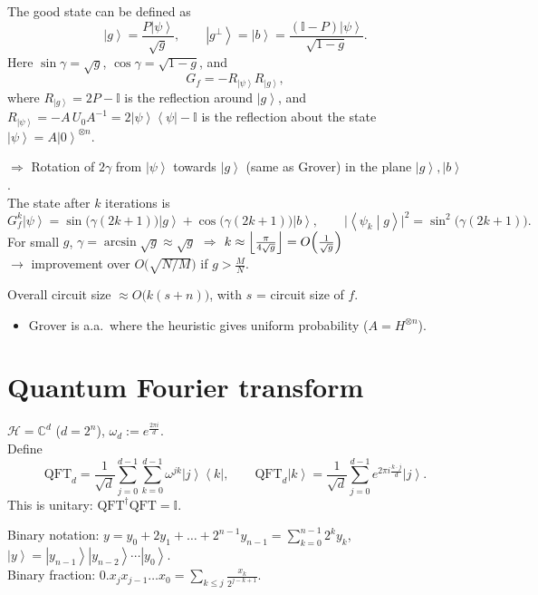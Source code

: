 \documentclass[11pt,a4paper]{article}
\renewcommand{\ket}[1]{\left|#1\right\rangle}
\renewcommand{\braket}[2]{\left\langle#1\middle|#2\right\rangle}
\newcommand{\ketbra}[2]{\left|#1\right\rangle\!\left\langle#2\right|}
\newcommand{\Hil}{\mathcal{H}}
\newcommand{\CC}{\mathbb{C}}
\newcommand{\id}{\mathbb{I}}
\begin{document}
The good state can be defined as
\[
\ket{g} = \frac{P\ket{\psi}}{\sqrt g},\qquad \ket{g^\perp} = \ket{b} = \frac{(\id-P)\ket{\psi}}{\sqrt{1-g}}.
\]
Here $\sin\gamma = \sqrt g$, $\cos\gamma = \sqrt{1-g}$, and
\[
G_f = -R_{\ket\psi}R_{\ket g},
\]
where $R_{\ket g} = 2P-\id$ is the reflection around $\ket g$, and $R_{\ket\psi} = -A\,U_0A^{-1} = 2\ketbra\psi\psi - \id$ is the reflection about the state $\ket\psi = A\ket{0}^{\otimes n}$.

$\Rightarrow$ Rotation of $2\gamma$ from $\ket\psi$ towards $\ket g$ (same as Grover) in the plane $\ket g,\ket b$.\\
The state after $k$ iterations is
\[
G_f^k\ket\psi = \sin\bigl(\gamma(2k+1)\bigr)\ket g + \cos\bigl(\gamma(2k+1)\bigr)\ket b,
\qquad
\bigl|\braket{\psi_k}{g}\bigr|^2 = \sin^2\bigl(\gamma(2k+1)\bigr).
\]
For small $g$, $\gamma = \arcsin\sqrt g\approx\sqrt g$ $\Rightarrow$ $k\approx\Bigl\lfloor\frac{\pi}{4\sqrt g}\Bigr\rfloor = O\Bigl(\frac{1}{\sqrt g}\Bigr)$\\
$\to$ improvement over $O\bigl(\sqrt{N/M}\bigr)$ if $g > \frac MN$.

Overall circuit size $\approx O\bigl(k(s+n)\bigr)$, with $s$ = circuit size of $f$.
\begin{itemize}
  \item Grover is a.a.\ where the heuristic gives uniform probability ($A = H^{\otimes n}$).
\end{itemize}

\section{Quantum Fourier transform}

$\Hil = \CC^d$ ($d = 2^n$), \quad $\omega_d := e^{\frac{2\pi i}{d}}$.\\
Define
\[
\mathrm{QFT}_d = \frac{1}{\sqrt d}\sum_{j=0}^{d-1}\sum_{k=0}^{d-1}\omega^{jk}\ketbra{j}{k},
\qquad
\mathrm{QFT}_d\ket{k} = \frac{1}{\sqrt d}\sum_{j=0}^{d-1}e^{2\pi i\frac{k\cdot j}{d}}\ket{j}.
\]
This is unitary: $\mathrm{QFT}^\dagger\mathrm{QFT} = \id$.

Binary notation: $y = y_0 + 2y_1 + \dots + 2^{n-1}y_{n-1} = \sum_{k=0}^{n-1}2^ky_k$, \quad $\ket y = \ket{y_{n-1}}\ket{y_{n-2}}\cdots\ket{y_0}$.\\
Binary fraction: $0.x_jx_{j-1}\dots x_0 = \sum_{k\le j}\frac{x_k}{2^{j-k+1}}$.
\end{document}

